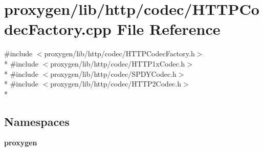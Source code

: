 \section{proxygen/lib/http/codec/\+H\+T\+T\+P\+Codec\+Factory.cpp File Reference}
\label{HTTPCodecFactory_8cpp}
{\ttfamily \#include $<$proxygen/lib/http/codec/\+H\+T\+T\+P\+Codec\+Factory.\+h$>$}\\*
{\ttfamily \#include $<$proxygen/lib/http/codec/\+H\+T\+T\+P1x\+Codec.\+h$>$}\\*
{\ttfamily \#include $<$proxygen/lib/http/codec/\+S\+P\+D\+Y\+Codec.\+h$>$}\\*
{\ttfamily \#include $<$proxygen/lib/http/codec/\+H\+T\+T\+P2\+Codec.\+h$>$}\\*
\subsection*{Namespaces}
\begin{DoxyCompactItemize}
\item 
 {\bf proxygen}
\end{DoxyCompactItemize}
